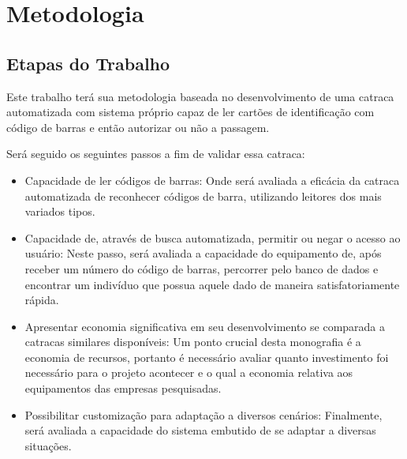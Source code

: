 \chapter{Metodologia}
\label{cap:metodologia}
\section{Etapas do Trabalho}
Este trabalho terá sua metodologia baseada no desenvolvimento de uma catraca automatizada com sistema próprio capaz de ler cartões de identificação com código de barras e então autorizar ou não a passagem.

Será seguido os seguintes passos a fim de validar essa catraca:
\begin{itemize}
    \item Capacidade de ler códigos de barras:
    \subitem Onde será avaliada a eficácia da catraca automatizada de reconhecer códigos de barra, utilizando leitores dos mais variados tipos.
    \item Capacidade de, através de busca automatizada, permitir ou negar o acesso ao usuário:
    \subitem Neste passo, será avaliada a capacidade do equipamento de, após receber um número do código de barras, percorrer pelo banco de dados e encontrar um indivíduo que possua aquele dado de maneira satisfatoriamente rápida. 
    \item Apresentar economia significativa em seu desenvolvimento se comparada a catracas similares disponíveis:
    \subitem Um ponto crucial desta monografia é a economia de recursos, portanto é necessário avaliar quanto investimento foi necessário para o projeto acontecer e o qual a economia relativa aos equipamentos das empresas pesquisadas. 
    \item Possibilitar customização para adaptação a diversos cenários:
    \subitem Finalmente, será avaliada a capacidade do sistema embutido de se adaptar a diversas situações. 
\end{itemize}